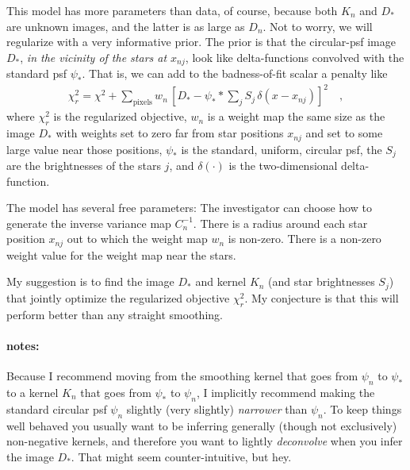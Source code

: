 \documentclass[12pt]{article}
\begin{document}
This model has more parameters than data, of course, because both
$K_n$ and $D_\ast$ are unknown images, and the latter is as large as
$D_n$.  Not to worry, we will regularize with a very informative
prior.  The prior is that the circular-psf image $D_\ast$, \emph{in
  the vicinity of the stars at $x_{nj}$}, look like delta-functions
convolved with the standard psf $\psi_\ast$.  That is, we can add to
the badness-of-fit scalar a penalty like
\begin{eqnarray}\displaystyle
\chi_r^2 = \chi^2 + \sum_{\mathrm{pixels}} w_n\,[D_\ast - \psi_\ast \ast \sum_j S_j\,\delta(x - x_{nj})]^2 \quad,
\end{eqnarray}
where $\chi_r^2$ is the regularized objective, $w_n$ is a weight map
the same size as the image $D_\ast$ with weights set to zero far from
star positions $x_{nj}$ and set to some large value near those
positions, $\psi_\ast$ is the standard, uniform, circular psf, the
$S_j$ are the brightnesses of the stars $j$, and $\delta(\cdot)$ is
the two-dimensional delta-function.

The model has several free parameters: The investigator can choose how
to generate the inverse variance map $C_n^{-1}$.  There is a radius
around each star position $x_{nj}$ out to which the weight map $w_n$
is non-zero.  There is a non-zero weight value for the weight map near
the stars.

My suggestion is to find the image $D_\ast$ and kernel $K_n$ (and star
brightnesses $S_j$) that jointly optimize the regularized objective
$\chi_r^2$.  My conjecture is that this will perform better than any
straight smoothing.

\paragraph{notes:}
Because I recommend moving from the smoothing kernel that goes from
$\psi_n$ to $\psi_\ast$ to a kernel $K_n$ that goes from $\psi_\ast$
to $\psi_n$, I implicitly recommend making the standard circular psf
$\psi_n$ slightly (very slightly) \emph{narrower} than $\psi_n$.  To
keep things well behaved you usually want to be inferring generally
(though not exclusively) non-negative kernels, and therefore you want
to lightly \emph{deconvolve} when you infer the image $D_\ast$.  That
might seem counter-intuitive, but hey.
\end{document}
